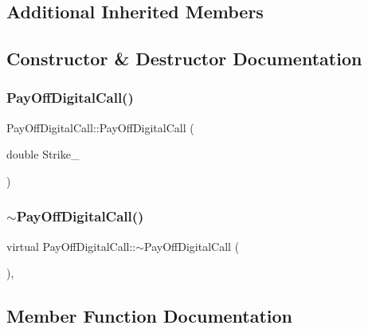 \subsection*{Additional Inherited Members}


\subsection{Constructor \& Destructor Documentation}
\hypertarget{classPayOffDigitalCall_a1fb26646cdb8544a4c8229161f38c12d}{}\label{classPayOffDigitalCall_a1fb26646cdb8544a4c8229161f38c12d} 
\subsubsection{\texorpdfstring{Pay\+Off\+Digital\+Call()}{PayOffDigitalCall()}}
{\footnotesize\ttfamily Pay\+Off\+Digital\+Call\+::\+Pay\+Off\+Digital\+Call (\begin{DoxyParamCaption}\item[{double}]{Strike\+\_\+ }\end{DoxyParamCaption})}

\hypertarget{classPayOffDigitalCall_a82b3274804a29c90b1df3f3dcef7dfa1}{}\label{classPayOffDigitalCall_a82b3274804a29c90b1df3f3dcef7dfa1} 
\subsubsection{\texorpdfstring{$\sim$\+Pay\+Off\+Digital\+Call()}{~PayOffDigitalCall()}}
{\footnotesize\ttfamily virtual Pay\+Off\+Digital\+Call\+::$\sim$\+Pay\+Off\+Digital\+Call (\begin{DoxyParamCaption}{ }\end{DoxyParamCaption})\hspace{0.3cm}{\ttfamily [inline]}, {\ttfamily [virtual]}}



\subsection{Member Function Documentation}
\hypertarget{classPayOffDigitalCall_a442824c18722ef620a6d4ac884cd39be}{}\label{classPayOffDigitalCall_a442824c18722ef620a6d4ac884cd39be} 
